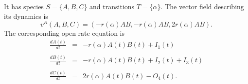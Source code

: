 \documentclass{compositionalityarticle}
\theoremstyle{compositionality}
\theoremstyle{remark}
\begin{document}
It has species $S = \{A,B,C\}$ and transitions $T = \{\alpha\}$.  
The vector field describing its dynamics is 
\begin{equation}
\label{eq_v_1}
 v^R(A,B,C) = ( -r(\alpha) AB, -r(\alpha) AB , 2r(\alpha) AB). 
\end{equation}
The corresponding open rate equation is 
\begin{equation}
\label{eq:open_rate_1}
\begin{array}{rcl} 
\displaystyle{\frac{dA(t)}{dt}} &=& - r(\alpha) A(t) B(t)  + I_1(t)\\ \\
\displaystyle{\frac{dB(t)}{dt}} &=& - r(\alpha) A(t) B(t) + I_2(t) + I_3(t) \\ \\
\displaystyle{\frac{dC(t)}{dt}} &=& 2r(\alpha) A(t) B(t) - O_4(t).
\end{array}
\end{equation}
\end{document}
